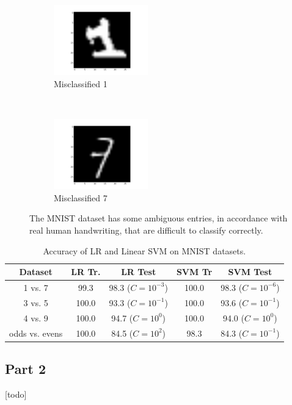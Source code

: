 \begin{figure}\label{fig:misclassified}
    \centering
    \begin{subfigure}[b]{0.5\columnwidth}
        \centering
        \includegraphics[height=1.2in]{figures/4_1_bad1}
        \caption{Misclassified 1}
    \end{subfigure}%
    ~ 
    \begin{subfigure}[b]{0.5\columnwidth}
        \centering
        \includegraphics[height=1.2in]{figures/4_1_bad7}
        \caption{Misclassified 7}
    \end{subfigure}
    \caption{The MNIST dataset has some ambiguous entries, in accordance with real human handwriting, that are difficult to classify correctly.}
\end{figure}

\begin{table}[ht!]
\centering
\begin{tabular}{||c c c c c||}  
 \hline
 Dataset & LR Tr. & LR Test & SVM Tr & SVM Test \\ [0.3ex] 
 \hline\hline
 1 vs. 7 & 99.3 & 98.3 ($C=10^{-3}$) & 100.0 & 98.3 ($C=10^{-6}$) \\ 
 \hline
 3 vs. 5 & 100.0 & 93.3 ($C=10^{-1}$) & 100.0 & 93.6 ($C=10^{-1}$) \\ 
 \hline
 4 vs. 9 & 100.0 & 94.7 ($C=10^{0}$) & 100.0 & 94.0 ($C=10^{0}$) \\ 
 \hline
 odds vs. evens & 100.0 & 84.5 ($C=10^{2}$) & 98.3 & 84.3 ($C=10^{-1}$) \\ 
 \hline
\end{tabular}
\caption{Accuracy of LR and Linear SVM on MNIST datasets.}
\label{table_4_1}
\end{table}

\subsection{Part 2}
[todo]


